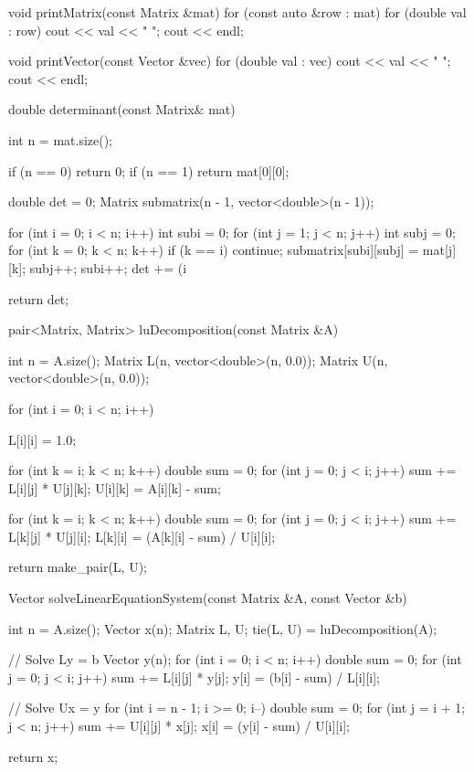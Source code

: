 void printMatrix(const Matrix &mat) {
    for (const auto &row : mat) {
        for (double val : row) {
            cout << val << " ";
        }
        cout << endl;
    }
}

void printVector(const Vector &vec) {
    for (double val : vec) {
        cout << val << " ";
    }
    cout << endl;
}

double determinant(const Matrix& mat) {
    int n = mat.size();
    
    if (n == 0) {
        return 0;
    }
    if (n == 1) {
        return mat[0][0];
    }

    double det = 0;
    Matrix submatrix(n - 1, vector<double>(n - 1));

    for (int i = 0; i < n; i++) {
        int subi = 0;
        for (int j = 1; j < n; j++) {
            int subj = 0;
            for (int k = 0; k < n; k++) {
                if (k == i) {
                    continue;
                }
                submatrix[subi][subj] = mat[j][k];
                subj++;
            }
            subi++;
        }
        det += (i %
    }

    return det;
}

pair<Matrix, Matrix> luDecomposition(const Matrix &A) {
    int n = A.size();
    Matrix L(n, vector<double>(n, 0.0));
    Matrix U(n, vector<double>(n, 0.0));

    for (int i = 0; i < n; i++) {
        L[i][i] = 1.0;

        for (int k = i; k < n; k++) {
            double sum = 0;
            for (int j = 0; j < i; j++) {
                sum += L[i][j] * U[j][k];
            }
            U[i][k] = A[i][k] - sum;
        }

        for (int k = i; k < n; k++) {
            double sum = 0;
            for (int j = 0; j < i; j++) {
                sum += L[k][j] * U[j][i];
            }
            L[k][i] = (A[k][i] - sum) / U[i][i];
        }
    }

    return make_pair(L, U);
}

Vector solveLinearEquationSystem(const Matrix &A, const Vector &b) {
    int n = A.size();
    Vector x(n);
    Matrix L, U;
    tie(L, U) = luDecomposition(A);

    // Solve Ly = b
    Vector y(n);
    for (int i = 0; i < n; i++) {
        double sum = 0;
        for (int j = 0; j < i; j++) {
            sum += L[i][j] * y[j];
        }
        y[i] = (b[i] - sum) / L[i][i];
    }

    // Solve Ux = y
    for (int i = n - 1; i >= 0; i--) {
        double sum = 0;
        for (int j = i + 1; j < n; j++) {
            sum += U[i][j] * x[j];
        }
        x[i] = (y[i] - sum) / U[i][i];
    }

    return x;
}

